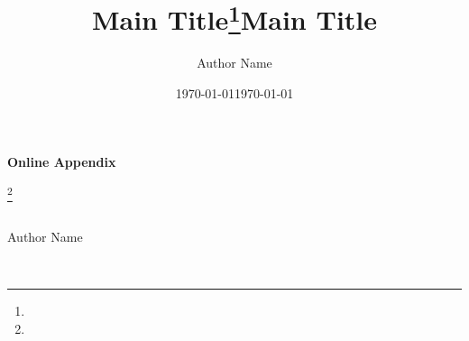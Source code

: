 \documentclass{article}
\title{Main Title\thanks{\blindtext}}
\author{Author Name}
\date{\today}
\begin{document}
\maketitle
\begin{abstract}
\blindtext
\end{abstract}

\newpage

\renewcommand*{\thefootnote}{\fnsymbol{footnote}}
\begin{titlepage}
    \centering
    {\LARGE \textbf{Online Appendix}}\\ [1.5em]
    {\LARGE \title{Main Title}\footnote[2]{\blindtext}}\\ [1.5em]
    {\large Author Name}\\ [1em]
    {\large \date{\today}}\\ [4em]

\begin{abstract}
    \blindtext
\end{abstract}

\vfill

\end{titlepage}
\end{document}
